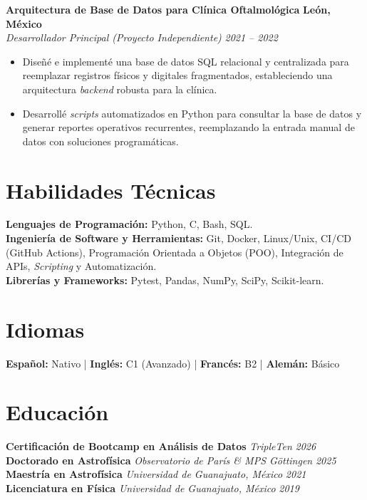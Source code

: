 \documentclass[10pt,a4paper]{article}
\begin{document}
\textbf{Arquitectura de Base de Datos para Clínica Oftalmológica} \hfill \textbf{León, México} \\
\textit{Desarrollador Principal (Proyecto Independiente)} \hfill \textit{2021 -- 2022}
\begin{itemize}[leftmargin=1.5em]
    \item Diseñé e implementé una base de datos SQL relacional y centralizada para reemplazar registros físicos y digitales fragmentados, estableciendo una arquitectura \textit{backend} robusta para la clínica.
    \item Desarrollé \textit{scripts} automatizados en Python para consultar la base de datos y generar reportes operativos recurrentes, reemplazando la entrada manual de datos con soluciones programáticas.
\end{itemize}

\section*{Habilidades Técnicas}
\textbf{Lenguajes de Programación:} Python, C, Bash, SQL. \\
\textbf{Ingeniería de Software y Herramientas:} Git, Docker, Linux/Unix, CI/CD (GitHub Actions), Programación Orientada a Objetos (POO), Integración de APIs, \textit{Scripting} y Automatización. \\
\textbf{Librerías y Frameworks:} Pytest, Pandas, NumPy, SciPy, Scikit-learn.

\section*{Idiomas}
\textbf{Español:} Nativo \quad | \quad \textbf{Inglés:} C1 (Avanzado) \quad | \quad \textbf{Francés:} B2 \quad | \quad \textbf{Alemán:} Básico


\section*{Educación}
\textbf{Certificación de Bootcamp en Análisis de Datos} \hfill \textit{TripleTen} \hfill \textit{2026}\\
\textbf{Doctorado en Astrofísica} \hfill \textit{Observatorio de París \& MPS Göttingen} \hfill \textit{2025}\\
\textbf{Maestría en Astrofísica} \hfill \textit{Universidad de Guanajuato, México} \hfill \textit{2021}\\
\textbf{Licenciatura en Física} \hfill \textit{Universidad de Guanajuato, México} \hfill \textit{2019}
\end{document}
